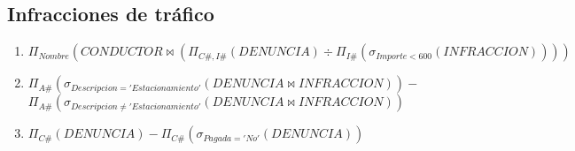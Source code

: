 \documentclass{db-practice}
\begin{document}
\subsection{Infracciones de tráfico}

\begin{enumerate}
    \item $\Pi_{Nombre} \left( CONDUCTOR \bowtie \left( \Pi_{C\#,I\#} \left( DENUNCIA \right) \div \Pi_{I\#} \left( \sigma_{Importe<600} \left( INFRACCION \right) \right) \right) \right)$
    \item $\Pi_{A\#} (\sigma_{Descripcion='Estacionamiento'} (DENUNCIA \bowtie INFRACCION)) -$ \\
          $\Pi_{A\#} (\sigma_{Descripcion \neq 'Estacionamiento'} (DENUNCIA \bowtie INFRACCION))$
    \item $\Pi_{C\#} \left( DENUNCIA \right) - \Pi_{C\#} \left( \sigma_{Pagada='No'} \left( DENUNCIA \right) \right)$
\end{enumerate}
\end{document}
